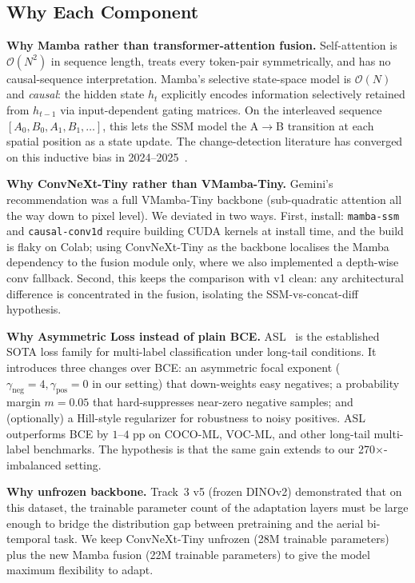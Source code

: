\documentclass[journal]{IEEEtran}
\begin{document}
\subsection{Why Each Component}\label{ssec:why}

\textbf{Why Mamba rather than transformer-attention fusion.} Self-attention is $\mathcal{O}(N^2)$ in sequence length, treats every token-pair symmetrically, and has no causal-sequence interpretation. Mamba's selective state-space model is $\mathcal{O}(N)$ and \emph{causal}: the hidden state $h_t$ explicitly encodes information selectively retained from $h_{t{-}1}$ via input-dependent gating matrices. On the interleaved sequence $[A_0, B_0, A_1, B_1, \ldots]$, this lets the SSM model the A$\to$B transition at each spatial position as a state update. The change-detection literature has converged on this inductive bias in 2024--2025~\cite{chen2024changemamba,ghazaei2025cssm}.

\textbf{Why ConvNeXt-Tiny rather than VMamba-Tiny.} Gemini's recommendation was a full VMamba-Tiny backbone (sub-quadratic attention all the way down to pixel level). We deviated in two ways. First, install: \texttt{mamba-ssm} and \texttt{causal-conv1d} require building CUDA kernels at install time, and the build is flaky on Colab; using ConvNeXt-Tiny as the backbone localises the Mamba dependency to the fusion module only, where we also implemented a depth-wise conv fallback. Second, this keeps the comparison with v1 clean: any architectural difference is concentrated in the fusion, isolating the SSM-vs-concat-diff hypothesis.

\textbf{Why Asymmetric Loss instead of plain BCE.} ASL~\cite{ridnik2021asl} is the established SOTA loss family for multi-label classification under long-tail conditions. It introduces three changes over BCE: an asymmetric focal exponent ($\gamma_\mathrm{neg}{=}4, \gamma_\mathrm{pos}{=}0$ in our setting) that down-weights easy negatives; a probability margin $m{=}0.05$ that hard-suppresses near-zero negative samples; and (optionally) a Hill-style regularizer for robustness to noisy positives. ASL outperforms BCE by $1$--$4$ pp on COCO-ML, VOC-ML, and other long-tail multi-label benchmarks. The hypothesis is that the same gain extends to our 270$\times$-imbalanced setting.

\textbf{Why unfrozen backbone.} Track~3 v5 (frozen DINOv2) demonstrated that on this dataset, the trainable parameter count of the adaptation layers must be large enough to bridge the distribution gap between pretraining and the aerial bi-temporal task. We keep ConvNeXt-Tiny unfrozen (28M trainable parameters) plus the new Mamba fusion (22M trainable parameters) to give the model maximum flexibility to adapt.
\end{document}
